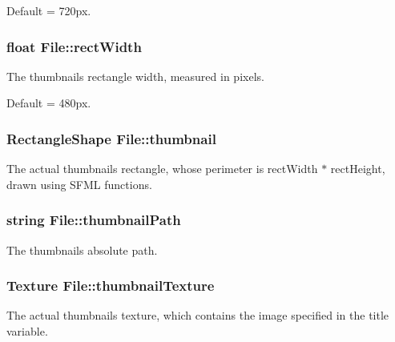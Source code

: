 Default = 720px. 
\subsubsection[{\texorpdfstring{rect\+Width}{rectWidth}}]{\setlength{\rightskip}{0pt plus 5cm}float File\+::rect\+Width\hspace{0.3cm}{\ttfamily [private]}}\hypertarget{classFile_ac7908347d94014323e180ebbf6e23281}{}\label{classFile_ac7908347d94014323e180ebbf6e23281}
The thumbnail\textquotesingle{}s rectangle width, measured in pixels.

Default = 480px. 
\subsubsection[{\texorpdfstring{thumbnail}{thumbnail}}]{\setlength{\rightskip}{0pt plus 5cm}Rectangle\+Shape File\+::thumbnail\hspace{0.3cm}{\ttfamily [private]}}\hypertarget{classFile_ac2c44ef77d792ce526677f3d891aaf80}{}\label{classFile_ac2c44ef77d792ce526677f3d891aaf80}
The actual thumbnail\textquotesingle{}s rectangle, whose perimeter is rect\+Width $\ast$ rect\+Height, drawn using S\+F\+ML functions. 
\subsubsection[{\texorpdfstring{thumbnail\+Path}{thumbnailPath}}]{\setlength{\rightskip}{0pt plus 5cm}string File\+::thumbnail\+Path\hspace{0.3cm}{\ttfamily [private]}}\hypertarget{classFile_a66dfca1082630f791541c8feefbc729d}{}\label{classFile_a66dfca1082630f791541c8feefbc729d}
The thumbnail\textquotesingle{}s absolute path. 
\subsubsection[{\texorpdfstring{thumbnail\+Texture}{thumbnailTexture}}]{\setlength{\rightskip}{0pt plus 5cm}Texture File\+::thumbnail\+Texture\hspace{0.3cm}{\ttfamily [private]}}\hypertarget{classFile_a569136d0908ee11b7afcf59769db5e0c}{}\label{classFile_a569136d0908ee11b7afcf59769db5e0c}
The actual thumbnail\textquotesingle{}s texture, which contains the image specified in the title variable. 
